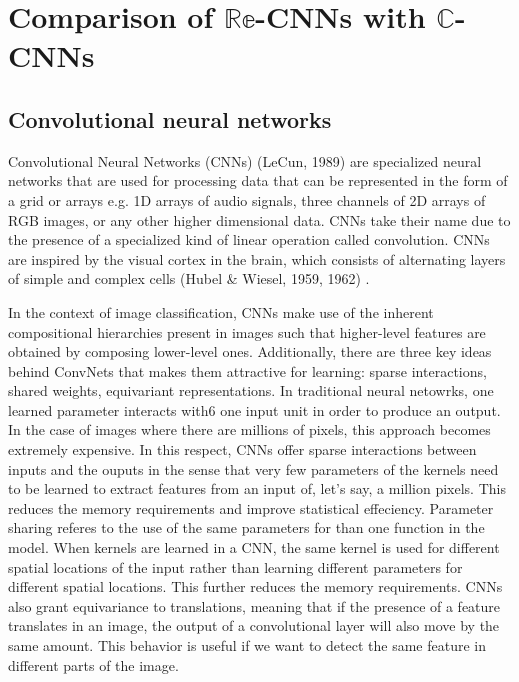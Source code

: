 \chapter{Comparison of $\mathbb{Re}$-CNNs with $\mathbb{C}$-CNNs}\label{chap:meth}
 
 
 \section{Convolutional neural networks}
 
 Convolutional Neural Networks (CNNs) (LeCun, 1989) \cite{lecun1989backpropagation} are specialized neural networks that are used for processing data that can be represented in the form of a grid or arrays e.g. 1D arrays of audio signals, three channels of 2D arrays of RGB images, or any other higher dimensional data. CNNs take their name due to the presence of a specialized kind of linear operation called convolution. CNNs are inspired by the visual cortex in the brain, which consists of alternating layers of simple and complex cells  (Hubel \& Wiesel, 1959, 1962) \cite{hubel1959receptive}\cite{hubel1962receptive}. 
 
In the context of image classification, CNNs make use of the inherent compositional hierarchies present in images such that higher-level features are obtained by composing lower-level ones. Additionally, there are three key ideas behind ConvNets that makes them attractive for learning: sparse interactions, shared weights, equivariant representations. In traditional neural netowrks, one learned parameter interacts with6 one input unit in order to produce an output. In the case of images where there are millions of pixels, this approach becomes extremely expensive. In this respect, CNNs offer sparse interactions between inputs and the ouputs in the sense that very few parameters of the kernels need to be learned to extract features from an input of, let's say, a million pixels. This reduces the memory requirements and improve statistical effeciency. Parameter sharing referes to the use of the same parameters for than one function in the model. When kernels are learned in a CNN, the same kernel is used for different spatial locations of the input rather than learning different parameters for different spatial locations. This further reduces the memory requirements. CNNs also grant equivariance to translations, meaning that if the presence of a feature translates in an image, the output of a convolutional layer will also move by the same amount. This behavior is useful if we want to detect the same feature in different parts of the image.\cite{DeepLearning}
 
